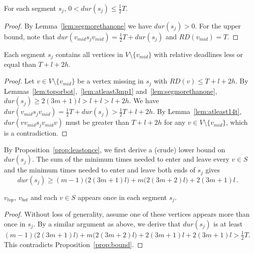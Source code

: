\documentclass[envcountsame]{llncs}
\begin{document}
\begin{proposition}\label{prop:bound}
For each segment $s_j$, $0 < \mathit{dur}(s_j) \leq \frac{1}{2}T$.
\end{proposition}
\begin{proof}
By Lemma~\ref{lem:segmorethanone} we have $\mathit{dur}(s_j) > 0$.
For the upper bound, note that $\mathit{dur}(v_{mid} s_j v_{mid}) = \frac{1}{2}T + \mathit{dur}(s_j)$
and $\mathit{RD}(v_{mid}) = T$.
\end{proof}

\begin{proposition}\label{prop:leastonce}
Each segment $s_j$ contains all vertices in $V \setminus \{ v_{mid} \}$ with relative deadlines less or equal than $T + l + 2h$.
\end{proposition}
\begin{proof}
Let $v \in V \setminus \{ v_{mid} \}$ be a vertex missing in $s_j$ with 
$\mathit{RD}(v) \leq T + l + 2h$. By Lemmas~\ref{lem:toporbot},~\ref{lem:atleast3mp1} and~\ref{lem:segmorethanone},
$\mathit{dur}(s_j) \geq 2(3m + 1)l > l + l > l + 2h$.
We have $\mathit{dur}(v_{mid} s_j v_{mid}) = \frac{1}{2}T + \mathit{dur}(s_j) > \frac{1}{2}T + l + 2h$.
By Lemma~\ref{lem:atleast14t}, $\mathit{dur}(vv_{mid} s_j v_{mid}v)$ must be greater than $T + l + 2h$
for any $v \in V \setminus \{ v_{mid} \}$, which is a contradiction.
\end{proof}

By Proposition~\ref{prop:leastonce}, we first derive a (crude) lower bound on $\mathit{dur}(s_j)$.
The sum of the minimum times needed to enter and leave every $v \in S$ and
the minimum times needed to enter and leave both ends of $s_j$ gives
\begin{equation}\label{eq:eq1}
\mathit{dur}(s_j) \geq (m-1)\big(2(3m+1)l\big) + m\big(2(3m+2)l\big) + 2(3m+1)l\,.
\end{equation}

\begin{proposition}\label{prop:tbonce}
$v_{top}$, $v_{bot}$ and each $v \in S$ appears once in each segment $s_j$.
\end{proposition}
\begin{proof}
Without loss of generality, assume one of these vertices appears more than once in $s_j$.
By a similar argument as above, we derive that $\mathit{dur}(s_j)$ is at least $(m-1)\big(2(3m+1)l\big) + m\big(2(3m+2)l\big) + 2(3m+1)l + 2(3m+1)l > \frac{1}{2}T$.
This contradicts Proposition~\ref{prop:bound}.
\end{proof}
\end{document}
